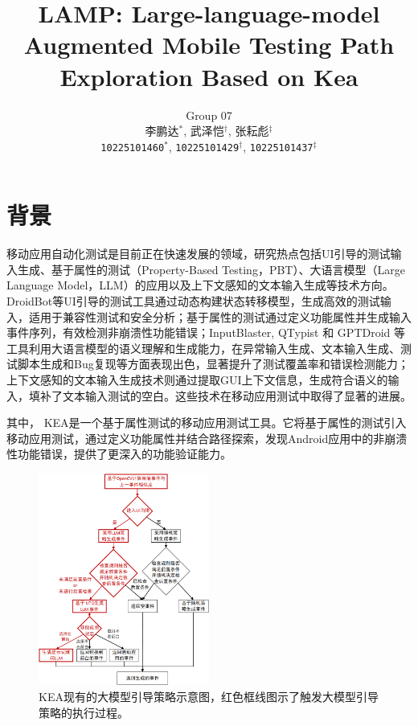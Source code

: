 \documentclass[twocolumn, 10pt]{article}
\title{\fontspec{Times New Roman} LAMP: Large-language-model Augmented Mobile Testing Path Exploration Based on Kea}
\author{
  Group 07\\
  李鹏达$^{*}$, 武泽恺$^{\dagger}$, 张耘彪$^{\ddagger}$\\
  \texttt{10225101460}$^{*}$, 
  \texttt{10225101429}$^{\dagger}$, 
  \texttt{10225101437}$^{\ddagger}$
}
\date{}
\newcommand{\figureBelowMargin}{\vspace{-2pt}}
\newcommand{\kea}{K{\small\MakeUppercase{ea}}}
\begin{document}
\maketitle

\section{背景}

移动应用自动化测试是目前正在快速发展的领域，研究热点包括UI引导的测试输入生成、基于属性的测试（Property-Based Testing，PBT）、大语言模型（Large Language Model，LLM）的应用以及上下文感知的文本输入生成等技术方向。DroidBot\cite{li2017droidbot}等UI引导的测试工具通过动态构建状态转移模型，生成高效的测试输入，适用于兼容性测试和安全分析；基于属性的测试\cite{xiong2024general}通过定义功能属性并生成输入事件序列，有效检测非崩溃性功能错误；InputBlaster\cite{liu2024testing}, QTypist\cite{liu2023fill} 和 GPTDroid\cite{liu2024make} 等工具利用大语言模型的语义理解和生成能力，在异常输入生成、文本输入生成、测试脚本生成和Bug复现等方面表现出色，显著提升了测试覆盖率和错误检测能力；上下文感知的文本输入生成技术\cite{liu2023fill}则通过提取GUI上下文信息，生成符合语义的输入，填补了文本输入测试的空白。这些技术在移动应用测试中取得了显著的进展。

其中， \kea\cite{xiong2024general}是一个基于属性测试的移动应用测试工具。它将基于属性的测试引入移动应用测试，通过定义功能属性并结合路径探索，发现Android应用中的非崩溃性功能错误，提供了更深入的功能验证能力。

\begin{figure}[ht!]
    \centering
    \includegraphics[width=0.5\textwidth]{llm}
    \caption{\kea 现有的大模型引导策略示意图，红色框线图示了触发大模型引导策略的执行过程。}
    \figureBelowMargin
    \label{fig:llm}
\end{figure}
\end{document}
